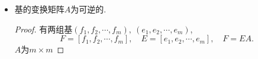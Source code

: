 \begin{itemize}
\begin{proof}
      考虑$Ax = 0$的解, 利用之前齐次线性方程组的解的性质, 参数个数为$(n-r)$, $r$为主元数目, 且$r \le m$.
      所以$Ax=0$一定有非$0$的解($m\neq n$).
  
      利用方程$F=EA$, 如果$Ax=0$有非零解, 那么
      \begin{equation}
        Fx=EAx = 0
      \end{equation}
      也有非零解, 和假设矛盾.
  \end{proof}

  \item 基的变换矩阵$A$为可逆的.
  \begin{proof}
      有两组基$(f_1,f_2,\cdots,f_m), \ (e_1,e_2,\cdots,e_m)$, 
      \begin{equation}
        F = [f_1,f_2,\cdots,f_m], \quad E = [e_1,e_2,\cdots,e_m], \quad F=EA.
      \end{equation}
      $A$为$m \times m$
  \end{proof}
\end{itemize}

